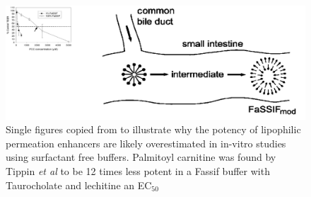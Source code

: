 \begin{figure}[ht]
\label{devel_fassif}
\includegraphics[width=\textwidth,height=\textheight,keepaspectratio]{graphics/devel_Fasssif_PCC2.png}
\caption{Single figures copied from \cite{tippin2008biorelevant,nawroth2011liposome} to illustrate why the potency of lipophilic permeation enhancers are likely overestimated in in-vitro studies using surfactant free buffers. Palmitoyl carnitine was found by Tippin \textit{et al} to be 12 times less potent in a Fassif buffer with Taurocholate and lechitine an EC$_{50}$}
\end{figure}


